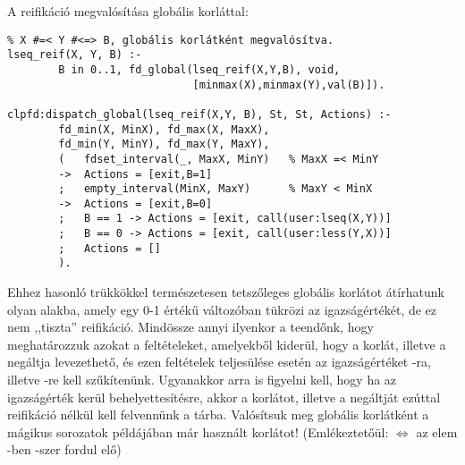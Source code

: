 A reifikáció megvalósítása globális korláttal:

\begin{verbatim}
% X #=< Y #<=> B, globális korlátként megvalósítva.
lseq_reif(X, Y, B) :-
        B in 0..1, fd_global(lseq_reif(X,Y,B), void,       
                             [minmax(X),minmax(Y),val(B)]).

clpfd:dispatch_global(lseq_reif(X,Y, B), St, St, Actions) :-
        fd_min(X, MinX), fd_max(X, MaxX),
        fd_min(Y, MinY), fd_max(Y, MaxY),
        (   fdset_interval(_, MaxX, MinY)   % MaxX =< MinY
        ->  Actions = [exit,B=1]  
        ;   empty_interval(MinX, MaxY)      % MaxY < MinX
        ->  Actions = [exit,B=0]
        ;   B == 1 -> Actions = [exit, call(user:lseq(X,Y))]
        ;   B == 0 -> Actions = [exit, call(user:less(Y,X))]
        ;   Actions = []
        ).
\end{verbatim}

Ehhez hasonló trükkökkel természetesen tetszőleges globális korlátot átírhatunk
olyan alakba, amely egy 0-1 értékű változóban tükrözi az igazságértékét, de
ez nem ,,tiszta'' reifikáció. Mindössze annyi ilyenkor a teendőnk, hogy meghatározzuk
azokat a feltételeket, amelyekből kiderül, hogy a korlát, illetve a negáltja levezethető,
és ezen feltételek teljesülése esetén az igazságértéket -ra, illetve -re
kell szűkítenünk. Ugyanakkor arra is figyelni kell, hogy ha az igazságérték kerül
behelyettesítésre, akkor a korlátot, illetve a negáltját ezúttal reifikáció nélkül
kell felvennünk a tárba.
\br
Valósítsuk meg globális korlátként a mágikus sorozatok példájában már használt
 korlátot! (Emlékeztetőül:  $\Leftrightarrow$
az  elem -ben -szer fordul elő)

